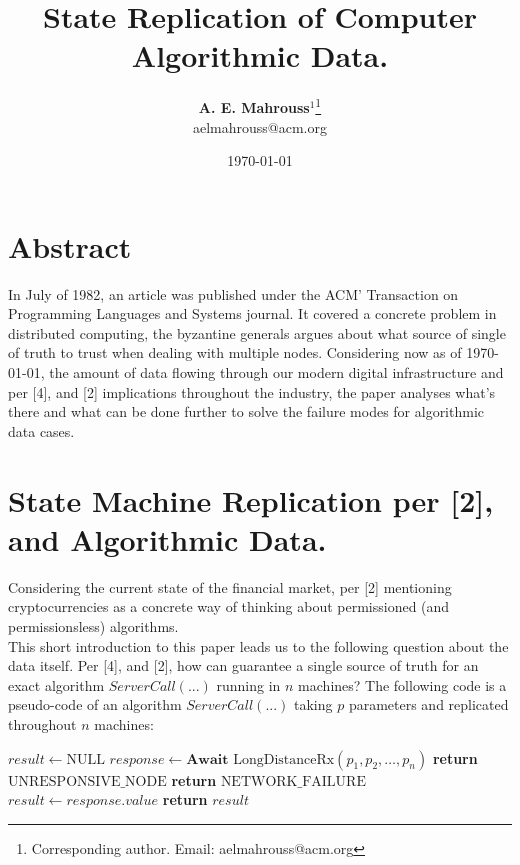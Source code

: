 \documentclass[10pt, twocolumn]{article}
\title{%
  \vspace{-1.5em}%
  \large\textbf{State Replication of Computer Algorithmic Data.}%
}
\author{%
  \textbf{A. E. Mahrouss}$^{1}$\thanks{Corresponding author. Email: aelmahrouss@acm.org}
  \\aelmahrouss@acm.org\\[0.4em]
}
\date{%
  \small \today
}
\theoremstyle{plain}
\theoremstyle{definition}
\theoremstyle{remark}
\begin{document}

\twocolumn[{%
  \maketitle
  \vspace{-0.5em}
  \vspace{0.8em}
  \rule{\linewidth}{0.4pt}
  \vspace{1em}
}]


\section{Abstract}

In July of 1982, an article was published under the ACM' Transaction on Programming Languages and Systems journal. It covered a concrete problem in distributed computing, the byzantine generals argues about what source of single of truth to trust when dealing with multiple nodes. Considering now as of \today, the amount of data flowing through our modern digital infrastructure and per [4], and [2] implications throughout the industry, the paper analyses what's there and what can be done further to solve the failure modes for algorithmic data cases.

\section{State Machine Replication per [2], and Algorithmic Data.}

Considering the current state of the financial market, per [2] mentioning cryptocurrencies as a concrete way of thinking about permissioned (and permissionsless) algorithms.\\
This short introduction to this paper leads us to the following question about the data itself. Per [4], and [2], how can guarantee a single source of truth for an exact algorithm $ServerCall(...)$ running in $n$ machines? The following code is a pseudo-code of an algorithm $ServerCall(...)$ taking $p$ parameters and replicated throughout $n$ machines:

\begin{algorithm}
\caption{ServerCall(...)}
\begin{algorithmic}[1]
    \State $result \leftarrow \text{NULL}$
    \State $response \leftarrow \textbf{Await } \text{LongDistanceRx}(p_1, p_2, \dots, p_n)$
        \State \textbf{return} $\text{UNRESPONSIVE\_NODE}$
        \State \textbf{return} $\text{NETWORK\_FAILURE}$
    \Else
        \State $result \leftarrow response.value$
        \State \textbf{return} $result$
    \EndIf
\EndProcedure
\end{algorithmic}
\end{algorithm}
\end{document}
